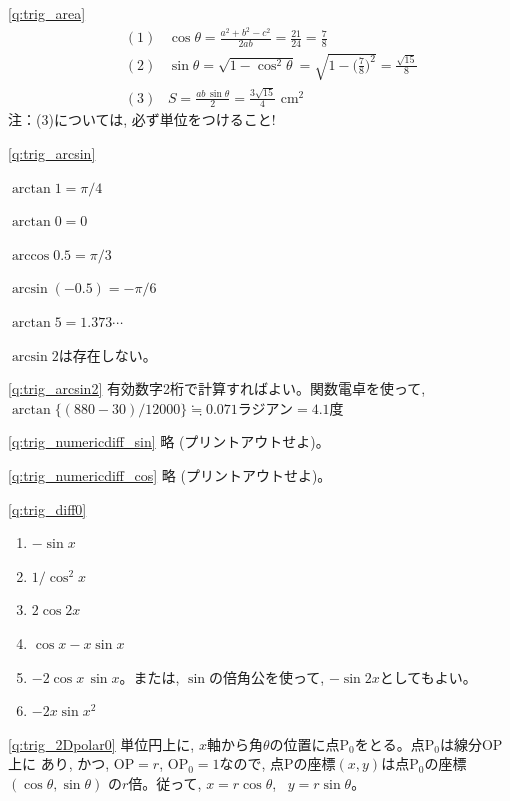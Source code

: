 
\ref{q:trig_area} 
\begin{eqnarray*}
&&(1)\,\,\,\,\,\cos\theta=\frac{a^2+b^2-c^2}{2ab}=\frac{21}{24}=\frac{7}{8}\\
&&(2)\,\,\,\,\,\sin\theta=\sqrt{1-\cos^2\theta}=\sqrt{1-\bigl(\frac{7}{8}\bigr)^2}=\frac{\sqrt{15}}{8}\\
&&(3)\,\,\,\,\,S=\frac{ab\,\sin\theta}{2}=\frac{3\sqrt{15}}{4}\,\,\text{cm}^2
\end{eqnarray*}
注：(3)については, 必ず単位をつけること!
\mv



\ref{q:trig_arcsin} 
\begin{edaenumerate}
\item $\arctan 1=\pi/4$
\item $\arctan 0=0$
\item $\arccos 0.5=\pi/3$
\item $\arcsin (-0.5)=-\pi/6$
\item $\arctan 5=1.373\cdots$
\item $\arcsin 2$は存在しない。
\end{edaenumerate}
\mv

\ref{q:trig_arcsin2}
 有効数字2桁で計算すればよい。関数電卓を使って, $\arctan\{(880-30)/12000\}\fallingdotseq0.071\text{ラジアン}=4.1$度
\mv



\ref{q:trig_numericdiff_sin} 略 (プリントアウトせよ)。

\ref{q:trig_numericdiff_cos} 略 (プリントアウトせよ)。

\ref{q:trig_diff0}  
\begin{enumerate}
\item $-\sin {x}$
\item $1/\cos^2 x$
\item $2\cos{2x}$
\item $\cos{x}-x\sin{x}$
\item $-2\cos x\,\sin x$。または, $\sin$の倍角公を使って, $-\sin{2x}$としてもよい。
\item $-2x\sin{x^{2}}$
\end{enumerate}
\mv


\ref{q:trig_2Dpolar0}  単位円上に, $x$軸から角$\theta$の位置に点P$_0$をとる。点P$_0$は線分OP上に
あり, かつ, OP$=r$, OP$_0=1$なので, 点Pの座標$(x, y)$は点P$_0$の座標$(\cos\theta, \sin\theta)$
の$r$倍。従って, $x=r\cos{\theta}$, \, $y=r\sin{\theta}$。
\mv

